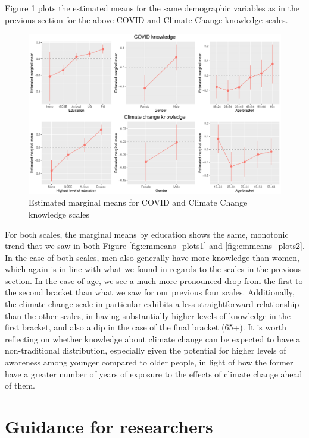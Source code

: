 \documentclass[11pt,halfline,a4paper,]{ouparticle}
\begin{document}
Figure \ref{fig:emmeans_plots4} plots the estimated means for the same
demographic variables as in the previous section for the above COVID and
Climate Change knowledge scales.

\begin{figure}[!h]
\includegraphics[width=1\linewidth]{Revisiting-the-Measurement-and-Dimensionality-of-Political-Knowledge--Evidence-from-Seven-European-Countries_files/figure-latex/emmeans_plots4-1} \caption{Estimated marginal means for COVID and Climate Change knowledge scales}\label{fig:emmeans_plots4}
\end{figure}

For both scales, the marginal means by education shows the same,
monotonic trend that we saw in both Figure \ref{fig:emmeans_plots1} and
\ref{fig:emmeans_plots2}. In the case of both scales, men also generally
have more knowledge than women, which again is in line with what we
found in regards to the scales in the previous section. In the case of
age, we see a much more pronounced drop from the first to the second
bracket than what we saw for our previous four scales. Additionally, the
climate change scale in particular exhibits a less straightforward
relationship than the other scales, in having substantially higher
levels of knowledge in the first bracket, and also a dip in the case of
the final bracket (65+). It is worth reflecting on whether knowledge
about climate change can be expected to have a non-traditional
distribution, especially given the potential for higher levels of
awareness among younger compared to older people, in light of how the
former have a greater number of years of exposure to the effects of
climate change ahead of them.

\hypertarget{guidance-for-researchers}{%
\section{Guidance for researchers}\label{guidance-for-researchers}}
\end{document}
